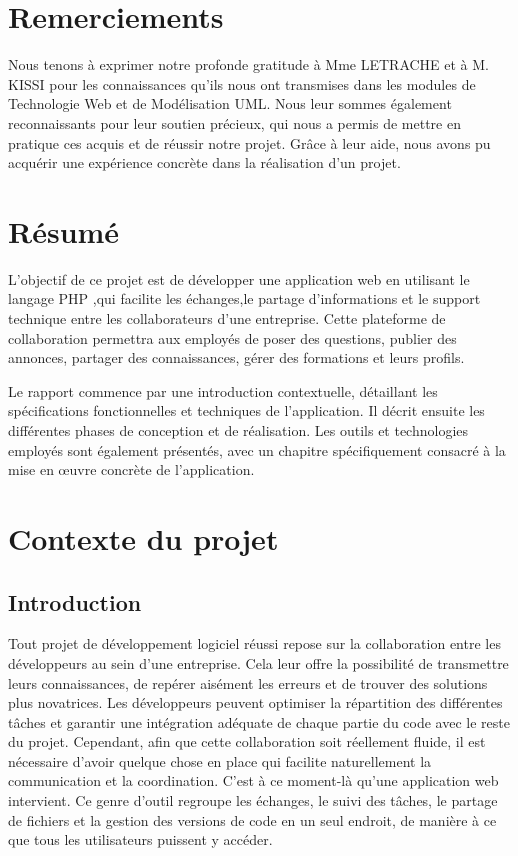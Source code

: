 \documentclass{article}
\begin{document}
    \setcounter{page}{2} 
    \tableofcontents
    \newpage

    \section{Remerciements}
        Nous tenons à exprimer notre profonde gratitude à Mme LETRACHE et à M. KISSI pour les connaissances qu'ils nous ont transmises dans les modules de Technologie Web et de Modélisation UML. Nous leur sommes également reconnaissants pour leur soutien précieux, qui nous a permis de mettre en pratique ces acquis et de réussir notre projet. Grâce à leur aide, nous avons pu acquérir une expérience concrète dans la réalisation d'un projet.
    
    \newpage
    
    \section{Résumé}
        L'objectif de ce projet est de développer une application web en utilisant le langage PHP
        ,qui facilite les échanges,le partage d'informations et le support technique entre les collaborateurs d'une entreprise.
        Cette plateforme de collaboration permettra aux employés de poser des questions, 
        publier des annonces, partager des connaissances, gérer des formations et leurs profils.

        Le rapport commence par une introduction contextuelle, détaillant les spécifications fonctionnelles et techniques de l'application. Il décrit ensuite les différentes phases de conception et de réalisation. Les outils et technologies employés sont également présentés, avec un chapitre spécifiquement consacré à la mise en œuvre concrète de l'application.
    
    \section{Contexte du projet}
        \subsection{Introduction}
            Tout projet de développement logiciel réussi repose sur la collaboration entre les développeurs au sein d'une entreprise. Cela leur offre la possibilité de transmettre leurs connaissances, de repérer aisément les erreurs et de trouver des solutions plus novatrices. Les développeurs peuvent optimiser la répartition des différentes tâches et garantir une intégration adéquate de chaque partie du code avec le reste du projet. Cependant, afin que cette collaboration soit réellement fluide, il est nécessaire d'avoir quelque chose en place qui facilite naturellement la communication et la coordination. C'est à ce moment-là qu'une application web intervient. Ce genre d'outil regroupe les échanges, le suivi des tâches, le partage de fichiers et la gestion des versions de code en un seul endroit, de manière à ce que tous les utilisateurs puissent y accéder.
        
\end{document}
